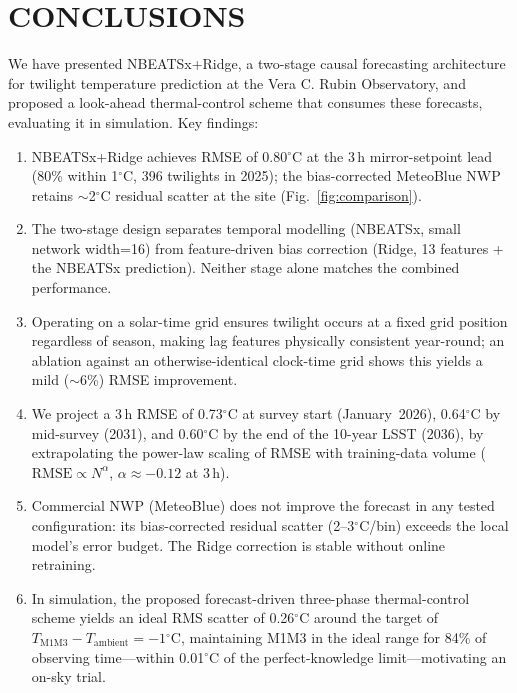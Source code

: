 \documentclass[]{spie}  %
\newcommand{\degC}{$^{\circ}$C}
\begin{document}
\section{CONCLUSIONS}
\label{sec:conclusions}

We have presented NBEATSx+Ridge, a two-stage causal forecasting architecture for twilight temperature prediction at the Vera C. Rubin Observatory, and proposed a look-ahead thermal-control scheme that consumes these forecasts, evaluating it in simulation. Key findings:

\begin{enumerate}[noitemsep]
    \item NBEATSx+Ridge achieves RMSE of 0.80\degC{} at the 3\,h mirror-setpoint lead (80\% within 1\degC{}, 396 twilights in 2025); the bias-corrected MeteoBlue NWP retains $\sim$2\degC{} residual scatter at the site (Fig.~\ref{fig:comparison}).
    \item The two-stage design separates temporal modelling (NBEATSx, small network width=16) from feature-driven bias correction (Ridge, 13 features + the NBEATSx prediction). Neither stage alone matches the combined performance.
    \item Operating on a solar-time grid ensures twilight occurs at a fixed grid position regardless of season, making lag features physically consistent year-round; an ablation against an otherwise-identical clock-time grid shows this yields a mild ($\sim$6\%) RMSE improvement.
    \item We project a 3\,h RMSE of 0.73\degC{} at survey start (January~2026), 0.64\degC{} by mid-survey (2031), and 0.60\degC{} by the end of the 10-year LSST (2036), by extrapolating the power-law scaling of RMSE with training-data volume ($\text{RMSE} \propto N^{\alpha}$, $\alpha \approx -0.12$ at 3\,h).
    \item Commercial NWP (MeteoBlue) does not improve the forecast in any tested configuration: its bias-corrected residual scatter (2--3\degC{}/bin) exceeds the local model's error budget. The Ridge correction is stable without online retraining.
    \item In simulation, the proposed forecast-driven three-phase thermal-control scheme yields an ideal RMS scatter of 0.26\degC{} around the target of $T_{\text{M1M3}} - T_{\text{ambient}} = -1$\degC{}, maintaining M1M3 in the ideal range for 84\% of observing time---within 0.01\degC{} of the perfect-knowledge limit---motivating an on-sky trial.
\end{enumerate}
\end{document}

